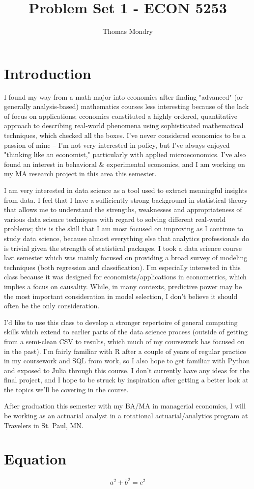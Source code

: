 \documentclass{article}
\title{Problem Set 1 - ECON 5253}
\author{Thomas Mondry}
\begin{document}
\maketitle

\section{Introduction}

I found my way from a math major into economics after finding "advanced" (or generally analysis-based) mathematics courses less interesting because of the lack of focus on applications; economics constituted a highly ordered, quantitative approach to describing real-world phenomena using sophisticated mathematical techniques, which checked all the boxes. I've never considered economics to be a passion of mine -- I'm not very interested in policy, but I've always enjoyed "thinking like an economist," particularly with applied microeconomics. I've also found an interest in behavioral \& experimental economics, and I am working on my MA research project in this area this semester.

I am very interested in data science as a tool used to extract meaningful insights from data. I feel that I have a sufficiently strong background in statistical theory that allows me to understand the strengths, weaknesses and appropriateness of various data science techniques with regard to solving different real-world problems; this is the skill that I am most focused on improving as I continue to study data science, because almost everything else that analytics professionals do is trivial given the strength of statistical packages. I took a data science course last semester which was mainly focused on providing a broad survey of modeling techniques (both regression and classification). I'm especially interested in this class because it was designed for economists/applications in econometrics, which implies a focus on causality. While, in many contexts, predictive power may be the most important consideration in model selection, I don't believe it should often be the only consideration.

I'd like to use this class to develop a stronger repertoire of general computing skills which extend to earlier parts of the data science process (outside of getting from a semi-clean CSV to results, which much of my coursework has focused on in the past). I'm fairly familiar with R after a couple of years of regular practice in my coursework and SQL from work, so I also hope to get familiar with Python and exposed to Julia through this course. I don't currently have any ideas for the final project, and I hope to be struck by inspiration after getting a better look at the topics we'll be covering in the course.

After graduation this semester with my BA/MA in managerial economics, I will be working as an actuarial analyst in a rotational actuarial/analytics program at Travelers in St. Paul, MN.

\section{Equation}

\[a^2+b^2=c^2\]
\end{document}
